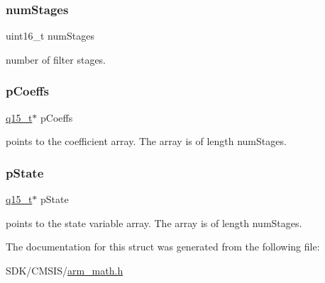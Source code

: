 \subsubsection{\texorpdfstring{num\+Stages}{numStages}}
{\footnotesize\ttfamily uint16\+\_\+t num\+Stages}

number of filter stages. \mbox{\label{structarm__fir__lattice__instance__q15_a7ca181a37f714d174445f486bebce26f}} 
\subsubsection{\texorpdfstring{p\+Coeffs}{pCoeffs}}
{\footnotesize\ttfamily \mbox{\hyperlink{arm__math_8h_ab5a8fb21a5b3b983d5f54f31614052ea}{q15\+\_\+t}}$\ast$ p\+Coeffs}

points to the coefficient array. The array is of length num\+Stages. \mbox{\label{structarm__fir__lattice__instance__q15_ae29dfdb736374fcddaeaec4b7770170c}} 
\subsubsection{\texorpdfstring{p\+State}{pState}}
{\footnotesize\ttfamily \mbox{\hyperlink{arm__math_8h_ab5a8fb21a5b3b983d5f54f31614052ea}{q15\+\_\+t}}$\ast$ p\+State}

points to the state variable array. The array is of length num\+Stages. 

The documentation for this struct was generated from the following file\+:\begin{DoxyCompactItemize}
\item 
S\+D\+K/\+C\+M\+S\+I\+S/\mbox{\hyperlink{arm__math_8h}{arm\+\_\+math.\+h}}\end{DoxyCompactItemize}
